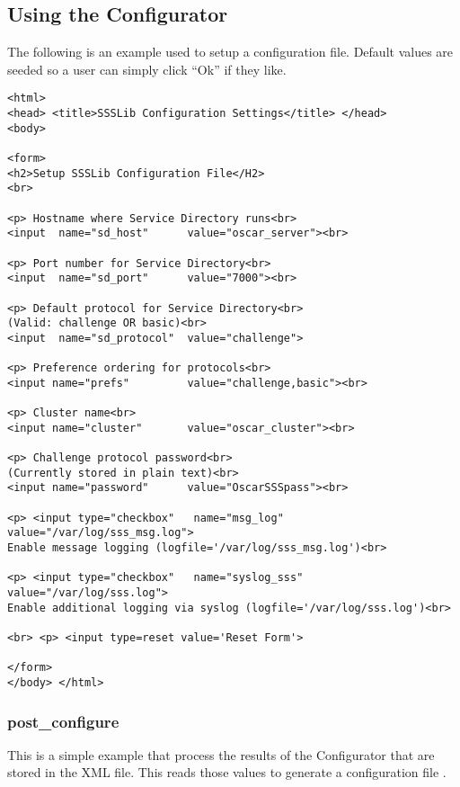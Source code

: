 \subsection{Using the Configurator}
\label{sect:example-configurator}

The following is an example  used to setup a
configuration file.  Default values are seeded so a user can simply click
``Ok'' if they like.

\begin{scriptsize}
\begin{verbatim}
<html>
<head> <title>SSSLib Configuration Settings</title> </head> 
<body>

<form>
<h2>Setup SSSLib Configuration File</H2>
<br>

<p> Hostname where Service Directory runs<br>
<input  name="sd_host"      value="oscar_server"><br>

<p> Port number for Service Directory<br>
<input  name="sd_port"      value="7000"><br>

<p> Default protocol for Service Directory<br>
(Valid: challenge OR basic)<br>
<input  name="sd_protocol"  value="challenge">  

<p> Preference ordering for protocols<br>
<input name="prefs"         value="challenge,basic"><br>

<p> Cluster name<br>
<input name="cluster"       value="oscar_cluster"><br>

<p> Challenge protocol password<br>
(Currently stored in plain text)<br>
<input name="password"      value="OscarSSSpass"><br>   

<p> <input type="checkbox"   name="msg_log"   value="/var/log/sss_msg.log">
Enable message logging (logfile='/var/log/sss_msg.log')<br>

<p> <input type="checkbox"   name="syslog_sss"   value="/var/log/sss.log">   
Enable additional logging via syslog (logfile='/var/log/sss.log')<br>

<br> <p> <input type=reset value='Reset Form'>

</form>
</body> </html>
\end{verbatim}
\end{scriptsize}


\subsubsection{post\_configure}

This is a simple  example that process the results
of the Configurator that are stored in the XML 
file.  This reads those values to generate a configuration file
.

